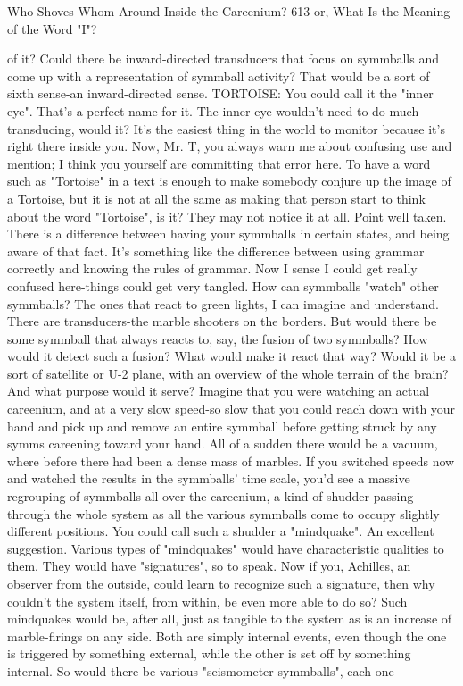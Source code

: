 Who Shoves Whom Around Inside the Careenium?                                          613
or, What Is the Meaning of the Word "I"?

  of it? Could there be inward-directed transducers that focus on symmballs and
  come up with a representation of symmball activity? That would be a sort of sixth
  sense-an inward-directed sense. TORTOISE: You could call it the "inner eye".
\achilles That's a perfect name for it.
\tortoise The inner eye wouldn't need to do much transducing, would it? It's the
  easiest thing in the world to monitor because it's right there inside you.
\achilles Now, Mr. T, you always warn me about confusing use and mention; I
  think you yourself are committing that error here. To have a word such as
  "Tortoise" in a text is enough to make somebody conjure up the image of a
  Tortoise, but it is not at all the same as making that person start to think about the
  word "Tortoise", is it? They may not notice it at all.
\tortoise Point well taken. There is a difference between having your symmballs
  in certain states, and being aware of that fact. It's something like the difference
  between using grammar correctly and knowing the rules of grammar.
\achilles Now I sense I could get really confused here-things could get very
  tangled. How can symmballs "watch" other symmballs? The ones that react to
  green lights, I can imagine and understand. There are transducers-the marble
  shooters on the borders. But would there be some symmball that always reacts to,
  say, the fusion of two symmballs? How would it detect such a fusion? What would
  make it react that way? Would it be a sort of satellite or U-2 plane, with an
  overview of the whole terrain of the brain? And what purpose would it serve?
\tortoise Imagine that you were watching an actual careenium, and at a very slow
  speed-so slow that you could reach down with your hand and pick up and remove
  an entire symmball before getting struck by any symms careening toward your
  hand. All of a sudden there would be a vacuum, where before there had been a
  dense mass of marbles. If you switched speeds now and watched the results in the
  symmballs' time scale, you'd see a massive regrouping of symmballs all over the
  careenium, a kind of shudder passing through the whole system as all the various
  symmballs come to occupy slightly different positions.
\achilles You could call such a shudder a "mindquake".
\tortoise An excellent suggestion. Various types of "mindquakes" would have
  characteristic qualities to them. They would have "signatures", so to speak. Now if
  you, Achilles, an observer from the outside, could learn to recognize such a
  signature, then why couldn't the system itself, from within, be even more able to do
  so? Such mindquakes would be, after all, just as tangible to the system as is an
  increase of marble-firings on any side. Both are simply internal events, even
  though the one is triggered by something external, while the other is set off by
  something internal.
\achilles So would there be various "seismometer symmballs", each one





